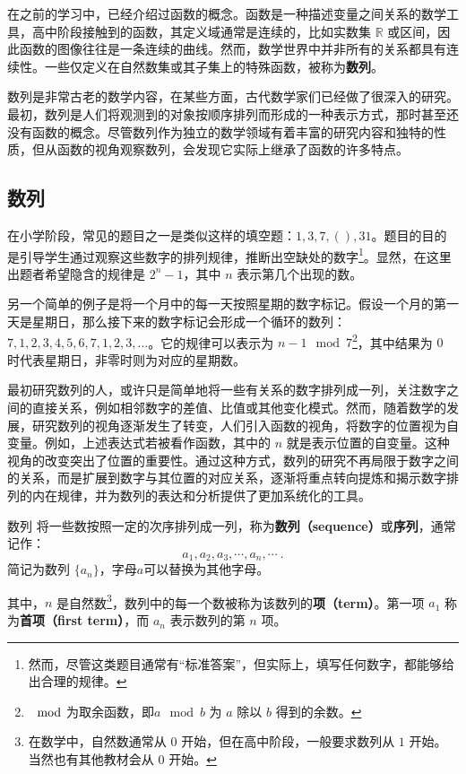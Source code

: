 
\begin{issues}
\issueDraft
\end{issues}

在之前的学习中，已经介绍过函数的概念。函数是一种描述变量之间关系的数学工具，高中阶段接触到的函数，其定义域通常是连续的，比如实数集 $\mathbb{R}$ 或区间，因此函数的图像往往是一条连续的曲线。然而，数学世界中并非所有的关系都具有连续性。一些仅定义在自然数集或其子集上的特殊函数，被称为\textbf{数列}。

数列是非常古老的数学内容，在某些方面，古代数学家们已经做了很深入的研究。最初，数列是人们将观测到的对象按顺序排列而形成的一种表示方式，那时甚至还没有函数的概念。尽管数列作为独立的数学领域有着丰富的研究内容和独特的性质，但从函数的视角观察数列，会发现它实际上继承了函数的许多特点。

\subsection{数列}

在小学阶段，常见的题目之一是类似这样的填空题：$1,3,7,(),31$。题目的目的是引导学生通过观察这些数字的排列规律，推断出空缺处的数字\footnote{然而，尽管这类题目通常有“标准答案”，但实际上，填写任何数字，都能够给出合理的规律。}。显然，在这里出题者希望隐含的规律是 $2^n - 1$，其中 $n$ 表示第几个出现的数。

另一个简单的例子是将一个月中的每一天按照星期的数字标记。假设一个月的第一天是星期日，那么接下来的数字标记会形成一个循环的数列：$7, 1, 2, 3, 4, 5, 6, 7, 1, 2, 3, \dots$。它的规律可以表示为 $n-1 \mod 7$\footnote{$\mod$为取余函数，即$a \mod b$ 为 $a$ 除以 $b$ 得到的余数。}，其中结果为 $0$ 时代表星期日，非零时则为对应的星期数。

最初研究数列的人，或许只是简单地将一些有关系的数字排列成一列，关注数字之间的直接关系，例如相邻数字的差值、比值或其他变化模式。然而，随着数学的发展，研究数列的视角逐渐发生了转变，人们引入函数的视角，将数字的位置视为自变量。例如，上述表达式若被看作函数，其中的 $n$ 就是表示位置的自变量。这种视角的改变突出了位置的重要性。通过这种方式，数列的研究不再局限于数字之间的关系，而是扩展到数字与其位置的对应关系，逐渐将重点转向提炼和揭示数字排列的内在规律，并为数列的表达和分析提供了更加系统化的工具。

\begin{definition}{数列}
将一些数按照一定的次序排列成一列，称为\textbf{数列（sequence）}或\textbf{序列}，通常记作：
\begin{equation}
a_1, a_2, a_3, \cdots, a_n, \cdots~.
\end{equation}
简记为数列 $\{a_n\}$，字母$a$可以替换为其他字母。

其中，$n$ 是自然数\footnote{在数学中，自然数通常从 $0$ 开始，但在高中阶段，一般要求数列从 $1$ 开始。当然也有其他教材会从 $0$ 开始。}，数列中的每一个数被称为该数列的\textbf{项（term）}。第一项 $a_1$ 称为\textbf{首项（first term）}，而 $a_n$ 表示数列的第 $n$ 项。
\end{definition}

